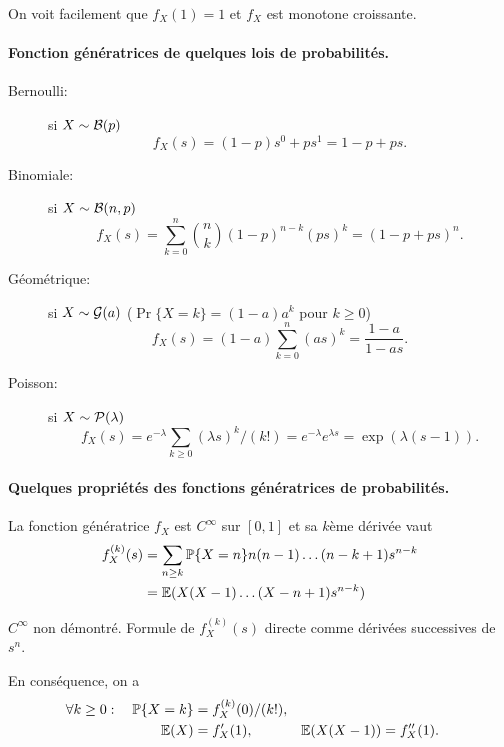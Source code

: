 \remark
On voit facilement que $f_X(1) = 1$ et $f_X$ est monotone croissante.

\paragraph*{Fonction génératrices de quelques lois de probabilités.}
\begin{description}
  \item[Bernoulli:] si $X \sim \mathcal{B}(p)$ 
  $$
  f_X(s) = (1-p) s^0 + p s^1 = 1 - p + p s.
  $$
  \item[Binomiale:] si $X \sim \mathcal{B}(n, p)$
  $$
  f_X(s) = \sum_{k=0}^n {{n}\choose{k}} (1-p)^{n-k} (ps)^k = (1 - p + ps)^n.
  $$
  \item[Géométrique:] si $X \sim \mathcal{G}(a)$ ($\Pr\{X = k\} = (1-a) a^k$ pour $k \geq 0$)
  $$
  f_X(s) = (1-a) \sum_{k=0}^n (as)^k = \frac{1-a}{1 - as}.
  $$
  \item[Poisson:] si $X \sim \mathcal{P}(\lambda)$
  $$
  f_X(s) = e^{-\lambda} \sum_{k\geq0} (\lambda s)^k / (k!) = e^{-\lambda} e^{\lambda s} = \exp(\lambda(s-1)).
  $$
\end{description}

\paragraph*{Quelques propriétés des fonctions génératrices de probabilités.}

\begin{proposition*}
  La fonction génératrice $f_X$ est $C^\infty$ sur $[0, 1]$ et sa $k$ème dérivée vaut
  \begin{align*}
    f_X^{(k)}(s) 
    & = \sum_{n \geq k} \operatorname{\mathbb{P}}\{X = n\} n(n-1)  \dots (n-k+1) s^{n-k} \\
    & = \operatorname{\mathbb{E}}(X (X-1) \dots (X-n+1) s^{n-k})
  \end{align*}
\end{proposition*}

\proof
  $C^\infty$ non démontré. Formule de $f_X^{(k)}(s)$ directe comme dérivées successives de $s^n$.
\eproof

\begin{corollary*}
  En conséquence, on a
  \begin{align*}
    \forall k \geq 0: \quad \operatorname{\mathbb{P}}\{X = k\} & = f_X^{(k)}(0) / (k!), \\
    \operatorname{\mathbb{E}}(X) & = f'_X(1), &
    \operatorname{\mathbb{E}}(X(X-1)) & = f''_X(1).
  \end{align*}
\end{corollary*}

